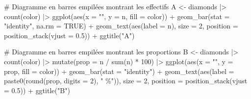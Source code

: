 \documentclass[
  letterpaper,
]{book}
\newenvironment{Shaded}{\begin{snugshade}}{\end{snugshade}}
\newcommand{\AttributeTok}[1]{\textcolor[rgb]{0.40,0.45,0.13}{#1}}
\newcommand{\CommentTok}[1]{\textcolor[rgb]{0.37,0.37,0.37}{#1}}
\newcommand{\ConstantTok}[1]{\textcolor[rgb]{0.56,0.35,0.01}{#1}}
\newcommand{\DecValTok}[1]{\textcolor[rgb]{0.68,0.00,0.00}{#1}}
\newcommand{\FloatTok}[1]{\textcolor[rgb]{0.68,0.00,0.00}{#1}}
\newcommand{\FunctionTok}[1]{\textcolor[rgb]{0.28,0.35,0.67}{#1}}
\newcommand{\NormalTok}[1]{\textcolor[rgb]{0.00,0.23,0.31}{#1}}
\newcommand{\OtherTok}[1]{\textcolor[rgb]{0.00,0.23,0.31}{#1}}
\newcommand{\SpecialCharTok}[1]{\textcolor[rgb]{0.37,0.37,0.37}{#1}}
\newcommand{\StringTok}[1]{\textcolor[rgb]{0.13,0.47,0.30}{#1}}
\begin{document}
\begin{Shaded}
\begin{Highlighting}[]
\CommentTok{\# Diagramme en barres empilées montrant les effectifs}
\NormalTok{A }\OtherTok{\textless{}{-}}
\NormalTok{  diamonds }\SpecialCharTok{|\textgreater{}}
  \FunctionTok{count}\NormalTok{(color) }\SpecialCharTok{|\textgreater{}}
  \FunctionTok{ggplot}\NormalTok{(}\FunctionTok{aes}\NormalTok{(}\AttributeTok{x =} \StringTok{""}\NormalTok{, }\AttributeTok{y =}\NormalTok{ n, }\AttributeTok{fill =}\NormalTok{ color)) }\SpecialCharTok{+}
  \FunctionTok{geom\_bar}\NormalTok{(}\AttributeTok{stat =} \StringTok{"identity"}\NormalTok{, }\AttributeTok{na.rm =} \ConstantTok{TRUE}\NormalTok{) }\SpecialCharTok{+}
  \FunctionTok{geom\_text}\NormalTok{(}\FunctionTok{aes}\NormalTok{(}\AttributeTok{label =}\NormalTok{ n),}
            \AttributeTok{size =} \DecValTok{2}\NormalTok{,}
            \AttributeTok{position =} \FunctionTok{position\_stack}\NormalTok{(}\AttributeTok{vjust =} \FloatTok{0.5}\NormalTok{)) }\SpecialCharTok{+}
  \FunctionTok{ggtitle}\NormalTok{(}\StringTok{"A"}\NormalTok{)}

\CommentTok{\# Diagramme en barres empilées montrant les proportions}
\NormalTok{B }\OtherTok{\textless{}{-}}
\NormalTok{  diamonds }\SpecialCharTok{|\textgreater{}}
  \FunctionTok{count}\NormalTok{(color) }\SpecialCharTok{|\textgreater{}}
  \FunctionTok{mutate}\NormalTok{(}\AttributeTok{prop =}\NormalTok{ n }\SpecialCharTok{/} \FunctionTok{sum}\NormalTok{(n) }\SpecialCharTok{*} \DecValTok{100}\NormalTok{) }\SpecialCharTok{|\textgreater{}}
  \FunctionTok{ggplot}\NormalTok{(}\FunctionTok{aes}\NormalTok{(}\AttributeTok{x =} \StringTok{""}\NormalTok{, }\AttributeTok{y =}\NormalTok{ prop, }\AttributeTok{fill =}\NormalTok{ color)) }\SpecialCharTok{+}
  \FunctionTok{geom\_bar}\NormalTok{(}\AttributeTok{stat =} \StringTok{"identity"}\NormalTok{) }\SpecialCharTok{+}
  \FunctionTok{geom\_text}\NormalTok{(}\FunctionTok{aes}\NormalTok{(}\AttributeTok{label =} \FunctionTok{paste0}\NormalTok{(}\FunctionTok{round}\NormalTok{(prop, }\AttributeTok{digits =} \DecValTok{2}\NormalTok{), }\StringTok{" \%"}\NormalTok{)),}
            \AttributeTok{size =} \DecValTok{2}\NormalTok{,}
            \AttributeTok{position =} \FunctionTok{position\_stack}\NormalTok{(}\AttributeTok{vjust =} \FloatTok{0.5}\NormalTok{)) }\SpecialCharTok{+}
  \FunctionTok{ggtitle}\NormalTok{(}\StringTok{"B"}\NormalTok{)}


\end{Highlighting}
\end{Shaded}
\end{document}
